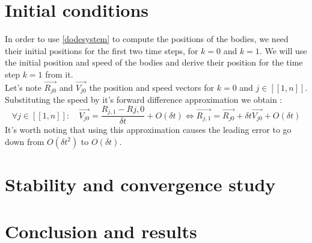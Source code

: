 \documentclass[a4paper,11pt]{article}
\begin{document}
\section{Initial conditions}
In order to use \eqref{dodesystem} to compute the positions of the bodies, we need their
initial positions for the first two time steps, for $k = 0$ and $k = 1$.
We will use the initial position and speed of the bodies and derive their position
for the time step $k = 1$ from it.\\
Let's note $\vec{R_{j0}}$ and $\vec{V_{j0}}$ the
position and speed vectors for $k=0$ and \linebreak[4] $j \in [[1, n]]$.
Substituting the speed by it's forward difference approximation we obtain :
\begin{equation}
  \forall j \in [[1, n]]: \quad
  \vec{V_{j0}} = \frac{R_{j,1} - R{j, 0}}{\delta t} + O(\delta t)
  \Leftrightarrow
  \vec{R_{j,1}} = \vec{R_{j0}} + \delta t \vec{V_{j0}} + O(\delta t)
\end{equation}
It's worth noting that using this approximation causes the leading error to go
down from $O(\delta t^2)$ to $O(\delta t)$.
\section{Stability and convergence study}
\section{Conclusion and results}
\end{document}

